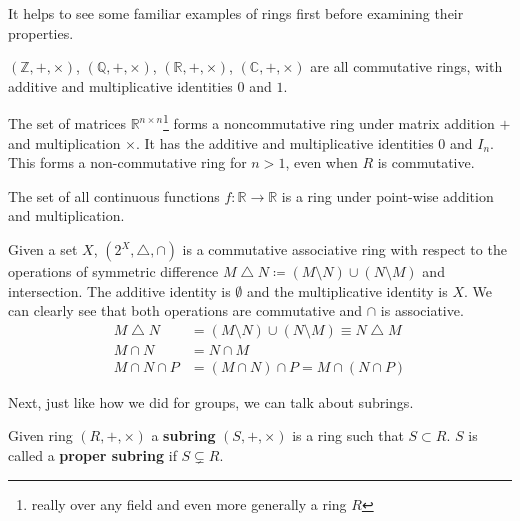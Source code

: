   It helps to see some familiar examples of rings first before examining their properties. 

  \begin{example}
    $(\mathbb{Z}, +, \times)$, $(\mathbb{Q}, +, \times)$, $(\mathbb{R}, +, \times)$, $(\mathbb{C}, +, \times)$ are all commutative rings, with additive and multiplicative identities $0$ and $1$. 
  \end{example}

  \begin{example}[Matrices]
    The set of matrices $\mathbb{R}^{n \times n}$\footnote{really over any field and even more generally a ring $R$} forms a noncommutative ring under matrix addition $+$ and multiplication $\times$. It has the additive and multiplicative identities $0$ and $I_{n}$. This forms a non-commutative ring for $n > 1$, even when $R$ is commutative.
  \end{example}

  \begin{example}
    The set of all continuous functions $f: \mathbb{R} \rightarrow \mathbb{R}$ is a ring under point-wise addition and multiplication. 
  \end{example}

  \begin{example}
    Given a set $X$, $(2^X, \bigtriangleup, \cap)$ is a commutative associative ring with respect to the operations of symmetric difference $M \bigtriangleup N \coloneqq (M \setminus N) \cup (N \setminus M)$ and intersection. The additive identity is $\emptyset$ and the multiplicative identity is $X$. We can clearly see that both operations are commutative and $\cap$ is associative. 
    \begin{align*}
      M \bigtriangleup N & = (M \setminus N) \cup (N \setminus M) \equiv N \bigtriangleup M \\
      M \cap N & = N \cap M \\
      M \cap N \cap P & = (M \cap N) \cap P = M \cap (N \cap P)
    \end{align*}
  \end{example}

  Next, just like how we did for groups, we can talk about subrings. 

  \begin{definition}[Subring]
    Given ring $(R, +, \times)$ a \textbf{subring} $(S, +, \times)$ is a ring such that $S \subset R$. $S$ is called a \textbf{proper subring} if $S \subsetneq R$. 
  \end{definition}

